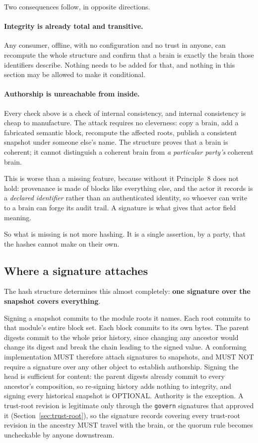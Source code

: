\documentclass[11pt,a4paper]{article}
\begin{document}
Two consequences follow, in opposite directions.

\paragraph{Integrity is already total and transitive.}
Any consumer, offline, with no configuration and no trust in anyone, can
recompute the whole structure and confirm that a brain is exactly the brain
those identifiers describe. Nothing needs to be added for that, and nothing in
this section may be allowed to make it conditional.

\paragraph{Authorship is unreachable from inside.}
Every check above is a check of internal consistency, and internal consistency
is cheap to manufacture. The attack requires no cleverness: copy a brain, add
a fabricated semantic block, recompute the affected roots, publish a
consistent snapshot under someone else's name. The structure proves that a
brain is coherent; it cannot distinguish a coherent brain from \emph{a
particular party's} coherent brain.

This is worse than a missing feature, because without it Principle~8 does not
hold: provenance is made of blocks like everything else, and the actor it
records is a \emph{declared identifier} rather than an authenticated identity,
so whoever can write to a brain can forge its audit trail. A signature is what
gives that actor field meaning.

So what is missing is not more hashing. It is a single assertion, by a party,
that the hashes cannot make on their own.

\subsection{Where a signature attaches}
\label{sec:sig-attach}

The hash structure determines this almost completely: \textbf{one signature
over the snapshot covers everything}.

Signing a snapshot commits to the module roots it names. Each root commits to
that module's entire block set. Each block commits to its own bytes. The parent
digests commit to the whole prior history, since changing any ancestor would
change its digest and break the chain leading to the signed value. A conforming
implementation MUST therefore attach signatures to snapshots, and MUST NOT
require a signature over any other object to establish authorship.
Signing the head is sufficient for content: the parent digests already commit
to every ancestor's composition, so re-signing history adds nothing to
integrity, and signing every historical snapshot is OPTIONAL. Authority is the
exception. A trust-root revision is legitimate only through the
\texttt{govern} signatures that approved it (Section~\ref{sec:trust-root}), so
the signature records covering every trust-root revision in the ancestry MUST
travel with the brain, or the quorum rule becomes uncheckable by anyone
downstream.
\end{document}
